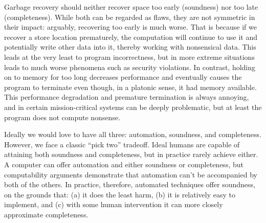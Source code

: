 
Garbage recovery should neither recover space too early (soundness) nor too late
(completeness). While both can be regarded as flaws, they are not symmetric in
their impact: arguably, recovering too early is much worse. That is because if
we recover a store location prematurely, the computation will continue to use it
and potentially write other data into it, thereby working with nonsensical data.
This leads at the very least to program incorrectness, but in more extreme
situations leads to much worse phenomena such as security violations. In
contrast, holding on to memory for too long decreases performance and eventually
causes the program to terminate even though, in a platonic sense, it had memory
available. This performance degradation and premature termination is always
annoying, and in certain mission-critical systems can be deeply problematic, but
at least the program does not compute nonsense.

Ideally we would love to have all three: automation, soundness, and
completeness. However, we face a classic “pick two” tradeoff. Ideal humans are
capable of attaining both soundness and completeness, but in practice rarely
achieve either. A computer can offer automation and either soundness or
completeness, but computability arguments demonstrate that automation can’t be
accompanied by both of the others. In practice, therefore, automated techniques
offer soundness, on the grounds that: (a) it does the least harm, (b) it is
relatively easy to implement, and (c) with some human intervention it can more
closely approximate completeness.

